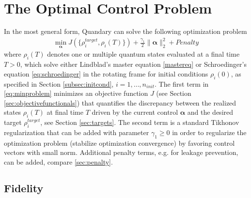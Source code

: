 \documentclass[11pt]{article}
\newcommand{\bfa}{\boldsymbol{\alpha}}
\begin{document}
\section{The Optimal Control Problem} \label{sec:optim}
In the most general form, Quandary can solve the following optimization problem
\begin{align}\label{eq:minproblem}
  \min_{\boldsymbol{\alpha}} J(\{\rho^{target}_i, \rho_i(T) \}) + \frac{\gamma_1}{2} \| \bfa \|^2_2 + Penalty
\end{align}
where $\rho_i(T)$ denotes one or multiple quantum states evaluated at a final time $T>0$, which solve either Lindblad's master equation \eqref{mastereq} or Schroedinger's equation \eqref{eq:schroedinger} in the rotating frame for initial conditions $\rho_i(0)$, as specified in Section \ref{subsec:initcond}, $i=1,\dots, n_{init}$. The first term in \eqref{eq:minproblem} minimizes an objective function $J$ (see Section \ref{sec:objectivefunctionals}) that quantifies the discrepancy between the realized states $\rho_i(T)$ at final time $T$ driven by the current control $\boldsymbol{\alpha}$ and the desired target $\rho^{target}_i$, see Section \ref{sec:targets}. 
The second term is a standard Tikhonov regularization that can be added with parameter $\gamma_1\geq 0$ in order to regularize the optimization problem (stabilize optimization convergence) by favoring control vectors with small norm. Additional penalty terms, e.g. for leakage prevention, can be added, compare \ref{sec:penalty}.

\subsection{Fidelity}\label{sec:fidelity}
\end{document}
